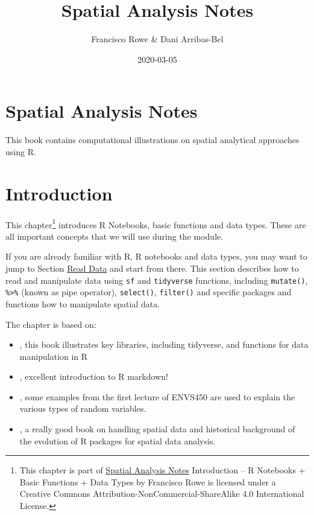 \documentclass[]{book}
\title{Spatial Analysis Notes}
\author{Francisco Rowe \& Dani Arribas-Bel}
\date{2020-03-05}
\begin{document}
\maketitle

{
\setcounter{tocdepth}{1}
\tableofcontents
}
\chapter{Spatial Analysis Notes}\label{spatial-analysis-notes}

This book contains computational illustrations on spatial analytical
approaches using R.

\chapter{Introduction}\label{intro}

This chapter\footnote{This chapter is part of \href{index.html}{Spatial
  Analysis Notes} {Introduction -- R Notebooks + Basic Functions + Data
  Types} by Francisco Rowe is licensed under a Creative Commons
  Attribution-NonCommercial-ShareAlike 4.0 International License.}
introduces R Notebooks, basic functions and data types. These are all
important concepts that we will use during the module.

If you are already familiar with R, R notebooks and data types, you may
want to jump to Section \protect\hyperlink{sec_readdata}{Read Data} and
start from there. This section describes how to read and manipulate data
using \texttt{sf} and \texttt{tidyverse} functions, including
\texttt{mutate()}, \texttt{\%\textgreater{}\%} (known as pipe operator),
\texttt{select()}, \texttt{filter()} and specific packages and functions
how to manipulate spatial data.

The chapter is based on:

\begin{itemize}
\item
  \citet{grolemund_wickham_2019_book}, this book illustrates key
  libraries, including tidyverse, and functions for data manipulation in
  R
\item
  \citet{Xie_et_al_2019_book}, excellent introduction to R markdown!
\item
  \citet{envs450_2018}, some examples from the first lecture of ENVS450
  are used to explain the various types of random variables.
\item
  \citet{Lovelace_et_al_2020_book}, a really good book on handling
  spatial data and historical background of the evolution of R packages
  for spatial data analysis.
\end{itemize}
\end{document}
